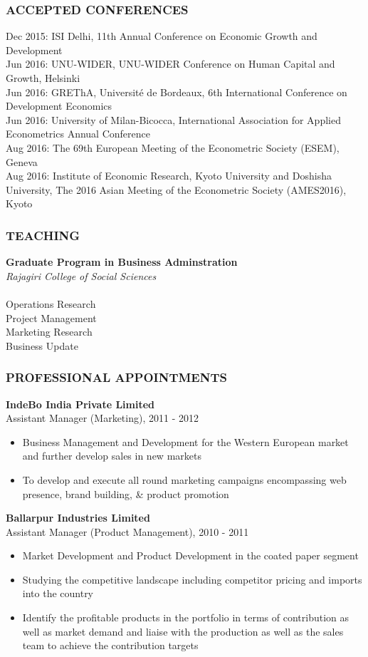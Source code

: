 \documentclass[12pt, a4paper]{article}
\begin{document}
	\subsubsection*{ACCEPTED CONFERENCES} 
Dec 2015: ISI Delhi, 11th Annual Conference on Economic Growth and Development \\ 
Jun 2016: UNU-WIDER, UNU-WIDER Conference on Human Capital and Growth, Helsinki \\
Jun 2016: GREThA, Universit\'{e} de Bordeaux, 6th International Conference on Development Economics \\	
Jun 2016: University of Milan-Bicocca, International Association for Applied Econometrics Annual Conference \\
Aug 2016: The 69th European Meeting of the Econometric Society (ESEM), Geneva \\
Aug 2016: Institute of Economic Research, Kyoto University and Doshisha University, The 2016 Asian Meeting of the Econometric Society (AMES2016), Kyoto
	\subsubsection*{TEACHING}
	\noindent\textbf{Graduate Program in Business Adminstration} \\
	\noindent\textit{Rajagiri College of Social Sciences} \\
	\\
		Operations Research \\
		Project Management \\
		Marketing Research \\
		Business Update 

	\subsubsection*{PROFESSIONAL APPOINTMENTS}
	\noindent\textbf{IndeBo India Private Limited} \\
	Assistant Manager (Marketing), 2011 - 2012 
	\begin{itemize}
		\item Business Management and Development for the Western European market and further develop sales in new markets
		\item To develop and execute all round marketing campaigns encompassing web presence, brand building, \& product promotion
	\end{itemize}
	
	\noindent\textbf{Ballarpur Industries Limited} \\
	Assistant Manager (Product Management), 2010 - 2011
	\begin{itemize}
		\item Market Development and Product Development in the coated paper segment
		\item Studying the competitive landscape including competitor pricing and imports into the country
		\item Identify the profitable products in the portfolio in terms of contribution as well as market demand and liaise with the production as well as the sales team to achieve the contribution targets
	\end{itemize}
\end{document}
